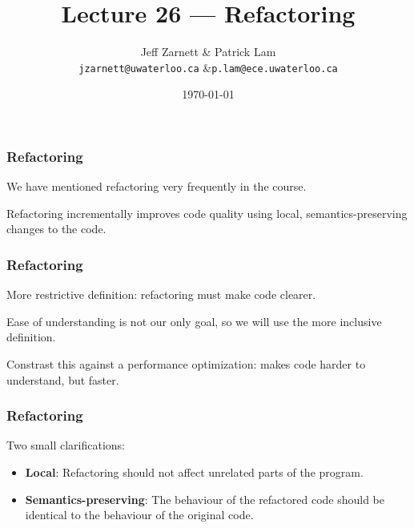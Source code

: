 
\usepackage{tikz-3dplot}

\title{Lecture 26 --- Refactoring}

\author{Jeff Zarnett \& Patrick Lam \\ \small \texttt{jzarnett@uwaterloo.ca} \&\texttt{p.lam@ece.uwaterloo.ca}}
\date{\today}



\begin{frame}
  \titlepage
\end{frame}


\begin{frame}
\frametitle{Refactoring}
\begin{changemargin}{1cm}

We have mentioned refactoring very frequently in the course.

\alert{Refactoring} incrementally improves code quality using local, semantics-preserving changes to the code.

\end{changemargin}
\end{frame}

\begin{frame}
\frametitle{Refactoring}
\begin{changemargin}{1cm}

More restrictive definition: refactoring must make code clearer.

Ease of understanding is not our only goal, so we will use the more inclusive definition.

Constrast this against a performance optimization: makes code harder to understand, but faster.

\end{changemargin}
\end{frame}


\begin{frame}
\frametitle{Refactoring}
\begin{changemargin}{1cm}

Two small clarifications:

\begin{itemize}
\item {\bf Local}: Refactoring should not affect unrelated parts of the
program. 
\item {\bf Semantics-preserving}: The behaviour
of the refactored code should be identical to the behaviour of the
original code. 
\end{itemize}

\end{changemargin}
\end{frame}


